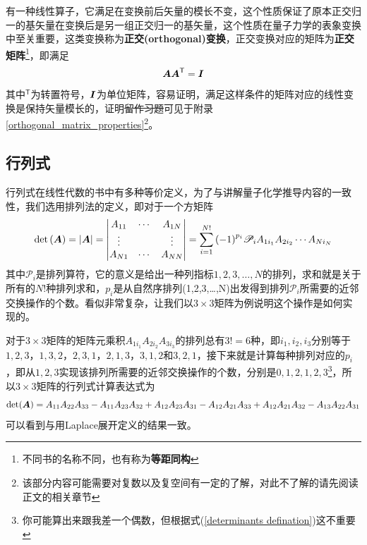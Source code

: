 \documentclass[12pt,a4paper,openany,twoside]{book}
\numberwithin{equation}{section}
\begin{document}
          有一种线性算子，它满足在变换前后矢量的模长不变，这个性质保证了原本正交归一的基矢量在变换后是另一组正交归一的基矢量，这个性质在量子力学的表象变换中至关重要，这类变换称为\textbf{正交(orthogonal)变换}，正交变换对应的矩阵为\textbf{正交矩阵}\footnote{不同书的名称不同，也有称为\textbf{等距同构}}，即满足
          \begin{equation}
            \vb*{A}\vb*{A}^\mathsf{T}=\vb*{I}
          \end{equation}
          其中$^\mathsf{T}$为转置符号，$\vb*{I}$为单位矩阵，容易证明，满足这样条件的矩阵对应的线性变换是保持矢量模长的，证明\sout{留作习题}可见于附录\ref{orthogonal_matrix_properties}\footnote{该部分内容可能需要对复数以及复空间有一定的了解，对此不了解的请先阅读正文的相关章节}。

        \subsection{行列式}
          行列式在线性代数的书中有多种等价定义，为了与讲解量子化学推导内容的一致性，我们选用排列法的定义，即对于一个方矩阵
          \begin{equation}
            \det\qty(\vb*{A})=\abs{\vb*{A}}=\mdet{
              A_{11} & \cdots & A_{1 N} \\
              \vdots & {} & \vdots \\
              A_{N 1} & \cdots & A_{N N}
            }=\sum_{i=1}^{N !}{\qty(-1)^{p_i} \mathscr{P}_i A_{1i_1} A_{2i_2} \cdots A_{N i_N}}
            \label{determinants defination}
          \end{equation}
          其中$\mathscr{P}_i$是排列算符，它的意义是给出一种列指标$1,2,3,\dots,N$的排列，求和就是关于所有的$N!$种排列求和，$p_i$是从自然序排列(1,2,3,\dots,N)出发得到排列$\mathscr{P}_i$所需要的近邻交换操作的个数。看似非常复杂，让我们以$3\times3$矩阵为例说明这个操作是如何实现的。

          对于$3\times3$矩阵的矩阵元乘积$A_{1i_1} A_{2i_2}A_{3i_3}$的排列总有$3!=6$种，即$i_1,i_2,i_3$分别等于$1,2,3$，$1,3,2$，$2,3,1$，$2,1,3$，$3,1,2$和$3,2,1$，接下来就是计算每种排列对应的$p_i$，即从$1,2,3$实现该排列所需要的近邻交换操作的个数，分别是$0,1,2,1,2,3$\footnote{你可能算出来跟我差一个偶数，但根据式(\ref{determinants defination})这不重要}，所以$3\times3$矩阵的行列式计算表达式为
          \begin{equation}
            \det(\vb*{A})=A_{11} A_{22}A_{33}-A_{11} A_{23}A_{32}+A_{12} A_{23}A_{31}-A_{12} A_{21}A_{33}+A_{12} A_{21}A_{32}-A_{13} A_{22}A_{31}
          \end{equation}
          可以看到与用Laplace展开定义的结果一致。
\end{document}
